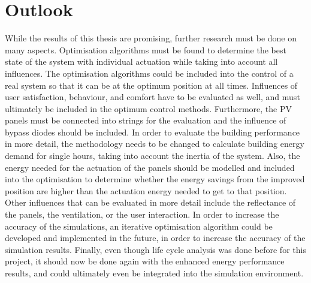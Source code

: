 \chapter{Outlook}
\label{ch:outlook}

While the results of this thesis are promising, further research must be done on many aspects. Optimisation algorithms must be found to determine the best state of the system with individual actuation while taking into account all influences. The optimisation algorithms could be included into the control of a real system so that it can be at the optimum position at all times. Influences of user satisfaction, behaviour, and comfort have to be evaluated as well, and must ultimately be included in the optimum control methods. Furthermore, the PV panels must be connected into strings for the evaluation and the influence of bypass diodes should be included. In order to evaluate the building performance in more detail, the methodology needs to be changed to calculate building energy demand for single hours, taking into account the inertia of the system. Also, the energy needed for the actuation of the panels should be modelled and included into the optimisation to determine whether the energy savings from the improved position are higher than the actuation energy needed to get to that position. Other influences that can be evaluated in more detail include the reflectance of the panels, the ventilation, or the user interaction. In order to increase the accuracy of the simulations, an iterative optimisation algorithm could be developed and implemented in the future, in order to increase the accuracy of the simulation results. Finally, even though life cycle analysis was done before for this project, it should now be done again with the enhanced energy performance results, and could ultimately even be integrated into the simulation environment. 





